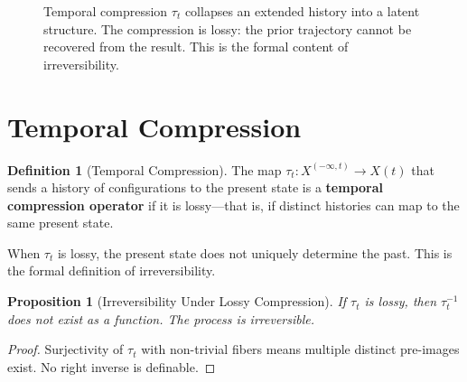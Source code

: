 \documentclass[11pt]{book}
\theoremstyle{plain}
\newtheorem{proposition}[theorem]{Proposition}
\theoremstyle{definition}
\newtheorem{definition}[theorem]{Definition}
\theoremstyle{remark}
\begin{document}
\begin{figure}[h]
\centering
{}
\caption{Temporal compression $\tau_t$ collapses an extended history into a latent structure.
The compression is lossy: the prior trajectory cannot be recovered from the result.
This is the formal content of irreversibility.}
\end{figure}

\section{Temporal Compression}

\begin{definition}[Temporal Compression]
The map $\tau_t : X^{(-\infty, t)} \to X(t)$ that sends a history of
configurations to the present state is a \textbf{temporal compression
operator} if it is lossy---that is, if distinct histories can map to
the same present state.
\end{definition}

When $\tau_t$ is lossy, the present state does not uniquely determine
the past. This is the formal definition of irreversibility.

\begin{proposition}[Irreversibility Under Lossy Compression]
If $\tau_t$ is lossy, then $\tau_t^{-1}$ does not exist as a function.
The process is irreversible.
\end{proposition}

\begin{proof}
Surjectivity of $\tau_t$ with non-trivial fibers means multiple distinct
pre-images exist. No right inverse is definable.
\end{proof}
\end{document}

